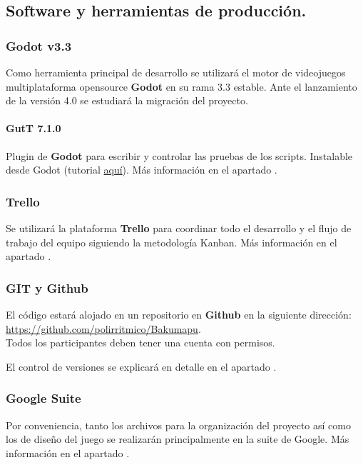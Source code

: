 \subsection{Software y herramientas de producción.}\label{intro:software-y-herramientas}

\subsubsection{Godot v3.3}
Como herramienta principal de desarrollo se utilizará el motor de videojuegos multiplataforma opensource \textbf{Godot} en su rama 3.3 estable. Ante el lanzamiento de la versión 4.0 se estudiará la migración del proyecto.

\begin{addmargin}[3em]{0pt}
	\paragraph{GutT 7.1.0}
	\noindent
	Plugin de \textbf{Godot} para escribir y controlar las pruebas de los scripts. Instalable desde Godot (tutorial \href{https://www.youtube.com/watch?v=5DrhMiuLRl0}{aquí}). Más información en el apartado .
\end{addmargin}

\subsubsection{Trello}
Se utilizará la plataforma \textbf{Trello} para coordinar todo el desarrollo y el flujo de trabajo del equipo siguiendo la metodología Kanban. Más información en el apartado .

\subsubsection{GIT y Github}
El código estará alojado en un repositorio  en \textbf{Github} en la siguiente dirección:\\
\url{https://github.com/polirritmico/Bakumapu}.\\
Todos los participantes deben tener una cuenta con permisos.

El control de versiones se explicará en detalle en el apartado .

\subsubsection{Google Suite}
Por conveniencia, tanto los archivos para la organización del proyecto así como los de diseño del juego se realizarán principalmente en la suite de Google. Más información en el apartado .

